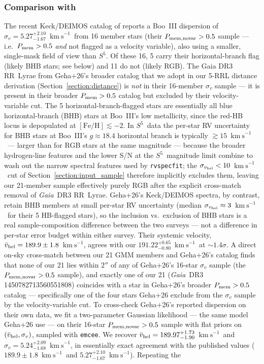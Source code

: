 \documentclass[twocolumn, apj, numberedappendix, appendixfloats]{openjournal_dhayaa}
\newcommand{\SSSSS}{${S}^5$\xspace}
\newcommand{\gaia}{\textit{Gaia}\xspace}
\newcommand{\vlosUnits}{$\mathrm{km~s}^{-1}$\xspace}
\begin{document}
\subsubsection{Comparison with \citet{Geha2026}}
The recent Keck/DEIMOS catalog of \citet{Geha2026} reports a Boo~III dispersion of $\sigma_v = 5.27^{+2.10}_{-1.67}$~\vlosUnits\ from 16 member stars (their $P_{\rm mem,novar} > 0.5$ sample --- i.e.\ $P_{\rm mem} > 0.5$ \emph{and} not flagged as a velocity variable), also using a smaller, single-mask field of view than \SSSSS.  Of these 16, 5 carry their horizontal-branch flag (likely BHB stars; see below) and 11 do not (likely RGB).  The Gaia DR3 RR~Lyrae from Geha+26's broader catalog that we adopt in our 5-RRL distance derivation (Section~\ref{section:distance}) is \emph{not} in their 16-member $\sigma_v$ sample --- it is present in their broader $P_{\rm mem} > 0.5$ catalog but excluded by their velocity-variable cut.  The 5 horizontal-branch-flagged stars are essentially all blue horizontal-branch (BHB) stars at Boo~III's low metallicity, since the red-HB locus is depopulated at $[\mathrm{Fe/H}] \lesssim -2$.  In \SSSSS\ data the per-star RV uncertainty for BHB stars at Boo~III's $g \approx 18.4$ horizontal branch is typically $\gtrsim 15$~\vlosUnits\ --- larger than for RGB stars at the same magnitude --- because the broader hydrogen-line features and the lower S/N at the \SSSSS\ magnitude limit combine to wash out the narrow spectral features used by \texttt{rvspecfit}; the $\sigma_{v_{\rm hel}} < 10$~\vlosUnits\ cut of Section~\ref{section:input_sample} therefore implicitly excludes them, leaving our 21-member sample effectively purely RGB after the explicit cross-match removal of \gaia\ DR3 RR~Lyrae.  Geha+26's Keck/DEIMOS spectra, by contrast, retain BHB members at small per-star RV uncertainty (median $\sigma_{v_{\rm hel}} \approx 3$~\vlosUnits\ for their 5 HB-flagged stars), so the inclusion vs.\ exclusion of BHB stars is a real sample-composition difference between the two surveys --- not a difference in per-star error budget within either survey.  Their systemic velocity, $\bar v_{\rm hel} = 189.9 \pm 1.8$~\vlosUnits, agrees with our $191.22^{+0.65}_{-0.80}$~\vlosUnits\ at $\sim 1.4\sigma$.  A direct on-sky cross-match between our 21 GMM members and Geha+26's catalog finds that none of our 21 lies within $2''$ of any of Geha+26's 16-star $\sigma_v$ sample (the $P_{\rm mem,novar} > 0.5$ sample), and exactly one of our 21 (\gaia\ DR3 1450782713560551808) coincides with a star in Geha+26's broader $P_{\rm mem} > 0.5$ catalog --- specifically one of the four stars Geha+26 exclude from the $\sigma_v$ sample by the velocity-variable cut.  To cross-check Geha+26's reported dispersion on their own data, we fit a two-parameter Gaussian likelihood --- the same model Geha+26 use \citep[Walker2006 form;][]{Walker2006} --- on their 16-star $P_{\rm mem,novar} > 0.5$ sample with flat priors on $(\bar v_{\rm hel}, \sigma_v)$, sampled with \texttt{emcee}.  We recover $\bar v_{\rm hel} = 189.97^{+1.73}_{-1.90}$~\vlosUnits\ and $\sigma_v = 5.24^{+2.09}_{-1.68}$~\vlosUnits, in essentially exact agreement with the \citet{Geha2026} published values ($189.9 \pm 1.8$~\vlosUnits\ and $5.27^{+2.10}_{-1.67}$~\vlosUnits).  Repeating the 
\end{document}
